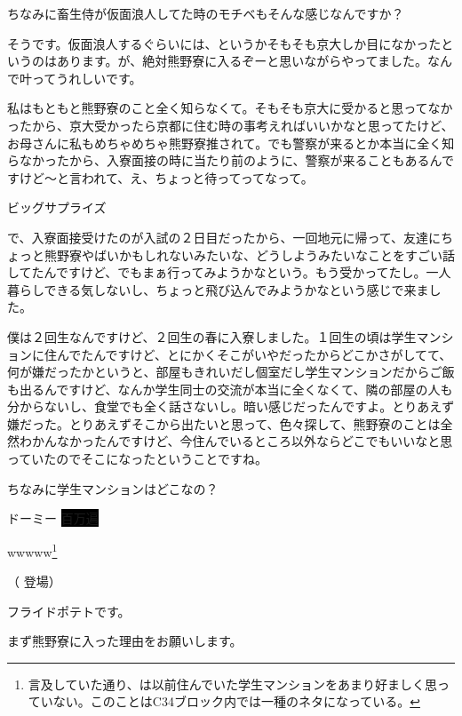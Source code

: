 \begin{multicols}{2}
  
ちなみに畜生侍が仮面浪人してた時のモチベもそんな感じなんですか？

  
そうです。仮面浪人するぐらいには、というかそもそも京大しか目になかったというのはあります。が、絶対熊野寮に入るぞーと思いながらやってました。なんで叶ってうれしいです。

  
私はもともと熊野寮のこと全く知らなくて。そもそも京大に受かると思ってなかったから、京大受かったら京都に住む時の事考えればいいかなと思ってたけど、お母さんに私もめちゃめちゃ熊野寮推されて。でも警察が来るとか本当に全く知らなかったから、入寮面接の時に当たり前のように、警察が来ることもあるんですけど～と言われて、え、ちょっと待ってってなって。

  
ビッグサプライズ

  
で、入寮面接受けたのが入試の２日目だったから、一回地元に帰って、友達にちょっと熊野寮やばいかもしれないみたいな、どうしようみたいなことをすごい話してたんですけど、でもまぁ行ってみようかなという。もう受かってたし。一人暮らしできる気しないし、ちょっと飛び込んでみようかなという感じで来ました。

  
僕は２回生なんですけど、２回生の春に入寮しました。１回生の頃は学生マンションに住んでたんですけど、とにかくそこがいやだったからどこかさがしてて、何が嫌だったかというと、部屋もきれいだし個室だし学生マンションだからご飯も出るんですけど、なんか学生同士の交流が本当に全くなくて、隣の部屋の人も分からないし、食堂でも全く話さないし。暗い感じだったんですよ。とりあえず嫌だった。とりあえずそこから出たいと思って、色々探して、熊野寮のことは全然わかんなかったんですけど、今住んでいるところ以外ならどこでもいいなと思っていたのでそこになったということですね。

  
ちなみに学生マンションはどこなの？

  
ドーミー \colorbox{black}{百万遍}

  
wwwww\footnote{言及していた通り、は以前住んでいた学生マンションをあまり好ましく思っていない。このことはC34ブロック内では一種のネタになっている。}

  
\centerline{（\hspace{4pt} 登場\hspace{4pt}）}

  
フライドポテトです。

  
まず熊野寮に入った理由をお願いします。


\end{multicols}
